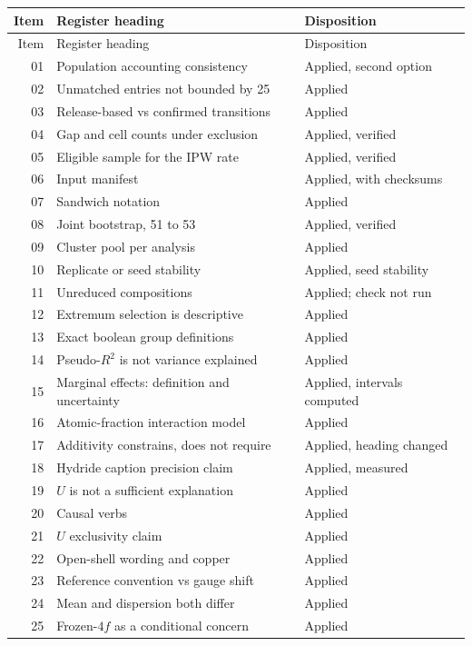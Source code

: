 \documentclass[11pt]{article}
\begin{document}
\begin{longtable}{rp{}l}
\toprule
Item & Register heading & Disposition \\
\midrule
\endfirsthead
\toprule
Item & Register heading & Disposition \\
\midrule
\endhead
01 & Population accounting consistency & Applied, second option \\
02 & Unmatched entries not bounded by 25 & Applied \\
03 & Release-based vs confirmed transitions & Applied \\
04 & Gap and cell counts under exclusion & Applied, verified \\
05 & Eligible sample for the IPW rate & Applied, verified \\
06 & Input manifest & Applied, with checksums \\
07 & Sandwich notation & Applied \\
08 & Joint bootstrap, 51 to 53 & Applied, verified \\
09 & Cluster pool per analysis & Applied \\
10 & Replicate or seed stability & Applied, seed stability \\
11 & Unreduced compositions & Applied; check not run \\
12 & Extremum selection is descriptive & Applied \\
13 & Exact boolean group definitions & Applied \\
14 & Pseudo-$R^2$ is not variance explained & Applied \\
15 & Marginal effects: definition and uncertainty & Applied, intervals computed \\
16 & Atomic-fraction interaction model & Applied \\
17 & Additivity constrains, does not require & Applied, heading changed \\
18 & Hydride caption precision claim & Applied, measured \\
19 & $U$ is not a sufficient explanation & Applied \\
20 & Causal verbs & Applied \\
21 & $U$ exclusivity claim & Applied \\
22 & Open-shell wording and copper & Applied \\
23 & Reference convention vs gauge shift & Applied \\
24 & Mean and dispersion both differ & Applied \\
25 & Frozen-$4f$ as a conditional concern & Applied \\

\end{longtable}
\end{document}
